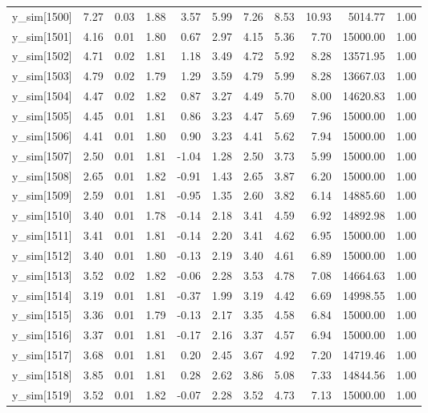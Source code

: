 \begin{table}[ht]
\begin{tabular}{rrrrrrrrrrr}
  y\_sim[1500] & 7.27 & 0.03 & 1.88 & 3.57 & 5.99 & 7.26 & 8.53 & 10.93 & 5014.77 & 1.00 \\ 
  y\_sim[1501] & 4.16 & 0.01 & 1.80 & 0.67 & 2.97 & 4.15 & 5.36 & 7.70 & 15000.00 & 1.00 \\ 
  y\_sim[1502] & 4.71 & 0.02 & 1.81 & 1.18 & 3.49 & 4.72 & 5.92 & 8.28 & 13571.95 & 1.00 \\ 
  y\_sim[1503] & 4.79 & 0.02 & 1.79 & 1.29 & 3.59 & 4.79 & 5.99 & 8.28 & 13667.03 & 1.00 \\ 
  y\_sim[1504] & 4.47 & 0.02 & 1.82 & 0.87 & 3.27 & 4.49 & 5.70 & 8.00 & 14620.83 & 1.00 \\ 
  y\_sim[1505] & 4.45 & 0.01 & 1.81 & 0.86 & 3.23 & 4.47 & 5.69 & 7.96 & 15000.00 & 1.00 \\ 
  y\_sim[1506] & 4.41 & 0.01 & 1.80 & 0.90 & 3.23 & 4.41 & 5.62 & 7.94 & 15000.00 & 1.00 \\ 
  y\_sim[1507] & 2.50 & 0.01 & 1.81 & -1.04 & 1.28 & 2.50 & 3.73 & 5.99 & 15000.00 & 1.00 \\ 
  y\_sim[1508] & 2.65 & 0.01 & 1.82 & -0.91 & 1.43 & 2.65 & 3.87 & 6.20 & 15000.00 & 1.00 \\ 
  y\_sim[1509] & 2.59 & 0.01 & 1.81 & -0.95 & 1.35 & 2.60 & 3.82 & 6.14 & 14885.60 & 1.00 \\ 
  y\_sim[1510] & 3.40 & 0.01 & 1.78 & -0.14 & 2.18 & 3.41 & 4.59 & 6.92 & 14892.98 & 1.00 \\ 
  y\_sim[1511] & 3.41 & 0.01 & 1.81 & -0.14 & 2.20 & 3.41 & 4.62 & 6.95 & 15000.00 & 1.00 \\ 
  y\_sim[1512] & 3.40 & 0.01 & 1.80 & -0.13 & 2.19 & 3.40 & 4.61 & 6.89 & 15000.00 & 1.00 \\ 
  y\_sim[1513] & 3.52 & 0.02 & 1.82 & -0.06 & 2.28 & 3.53 & 4.78 & 7.08 & 14664.63 & 1.00 \\ 
  y\_sim[1514] & 3.19 & 0.01 & 1.81 & -0.37 & 1.99 & 3.19 & 4.42 & 6.69 & 14998.55 & 1.00 \\ 
  y\_sim[1515] & 3.36 & 0.01 & 1.79 & -0.13 & 2.17 & 3.35 & 4.58 & 6.84 & 15000.00 & 1.00 \\ 
  y\_sim[1516] & 3.37 & 0.01 & 1.81 & -0.17 & 2.16 & 3.37 & 4.57 & 6.94 & 15000.00 & 1.00 \\ 
  y\_sim[1517] & 3.68 & 0.01 & 1.81 & 0.20 & 2.45 & 3.67 & 4.92 & 7.20 & 14719.46 & 1.00 \\ 
  y\_sim[1518] & 3.85 & 0.01 & 1.81 & 0.28 & 2.62 & 3.86 & 5.08 & 7.33 & 14844.56 & 1.00 \\ 
  y\_sim[1519] & 3.52 & 0.01 & 1.82 & -0.07 & 2.28 & 3.52 & 4.73 & 7.13 & 15000.00 & 1.00 \\ 

\end{tabular}
\end{table}
